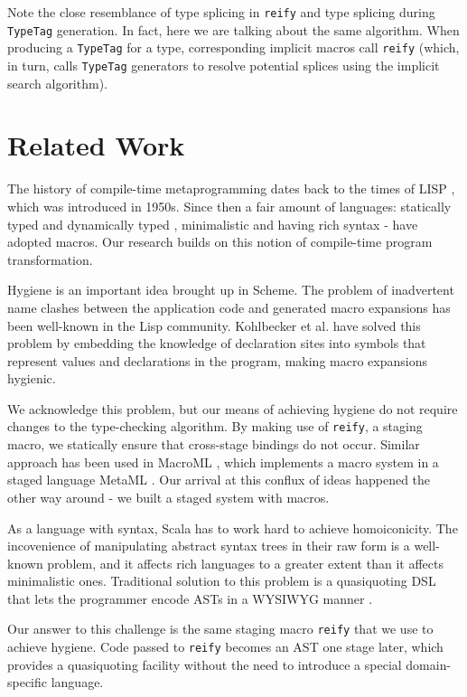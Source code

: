 \documentclass{llncs}
\begin{document}
Note the close resemblance of type splicing in \lstinline$reify$ and type splicing during \lstinline$TypeTag$ generation. In fact, here we are talking about the same algorithm. When producing a \lstinline$TypeTag$ for a type, corresponding implicit macros call \lstinline$reify$ (which, in turn, calls \lstinline$TypeTag$ generators to resolve potential splices using the implicit search algorithm).

\section{Related Work}

The history of compile-time metaprogramming dates back to the times of LISP \cite{steele90}, which was introduced in 1950s. Since then a fair amount of languages: statically typed \cite{sheard02} and dynamically typed \cite{rahien10}, minimalistic \cite{scheme10} and having rich syntax \cite{skalski05} - have adopted macros. Our research builds on this notion of compile-time program transformation.

Hygiene is an important idea brought up in Scheme. The problem of inadvertent name clashes between the application code and generated macro expansions has been well-known in the Lisp community. Kohlbecker et al.  \cite{kohlbecker86} have solved this problem by embedding the knowledge of declaration sites into symbols that represent values and declarations in the program, making macro expansions hygienic.

We acknowledge this problem, but our means of achieving hygiene do not require changes to the type-checking algorithm. By making use of \lstinline$reify$, a staging macro, we statically ensure that cross-stage bindings do not occur. Similar approach has been used in MacroML \cite{ganz01}, which implements a macro system in a staged language MetaML \cite{taha99}. Our arrival at this conflux of ideas happened the other way around - we built a staged system with macros.

As a language with syntax, Scala has to work hard to achieve homoiconicity. The incovenience of manipulating abstract syntax trees in their raw form is a well-known problem, and it affects rich languages to a greater extent than it affects minimalistic ones. Traditional solution to this problem is a quasiquoting DSL that lets the programmer encode ASTs in a WYSIWYG manner \cite{bawden99,skalski05,mainland07}.

Our answer to this challenge is the same staging macro \lstinline$reify$ that we use to achieve hygiene. Code passed to \lstinline$reify$ becomes an AST one stage later, which provides a quasiquoting facility without the need to introduce a special domain-specific language.
\end{document}
